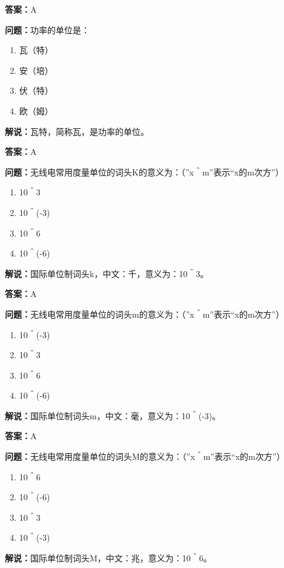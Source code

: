\documentclass[UTF8]{ctexbook}
\begin{document}
\textbf{答案：}A

\textbf{问题：}功率的单位是：

\begin{enumerate}[label=\Alph*), leftmargin=3em]
  \item 瓦（特）
  \item 安（培）
  \item 伏（特）
  \item 欧（姆）
\end{enumerate}

\textbf{解说：}瓦特，简称瓦，是功率的单位。

\textbf{答案：}A

\textbf{问题：}无线电常用度量单位的词头K的意义为：（”x＾m”表示“x的m次方”）

\begin{enumerate}[label=\Alph*), leftmargin=3em]
  \item 10＾3
  \item 10＾(-3)
  \item 10＾6
  \item 10＾(-6)
\end{enumerate}

\textbf{解说：}国际单位制词头k，中文：千，意义为：10＾3。

\textbf{答案：}A

\textbf{问题：}无线电常用度量单位的词头m的意义为：（”x＾m”表示“x的m次方”）

\begin{enumerate}[label=\Alph*), leftmargin=3em]
  \item 10＾(-3)
  \item 10＾3
  \item 10＾6
  \item 10＾(-6)
\end{enumerate}

\textbf{解说：}国际单位制词头m，中文：毫，意义为：10＾(-3)。

\textbf{答案：}A

\textbf{问题：}无线电常用度量单位的词头M的意义为：（”x＾m”表示“x的m次方”）

\begin{enumerate}[label=\Alph*), leftmargin=3em]
  \item 10＾6
  \item 10＾(-6)
  \item 10＾3
  \item 10＾(-3)
\end{enumerate}

\textbf{解说：}国际单位制词头M，中文：兆，意义为：10＾6。
\end{document}
